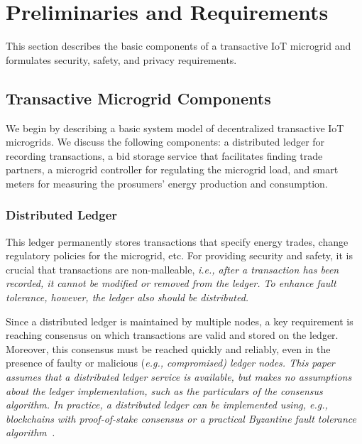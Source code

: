 \section{Preliminaries and Requirements}

This section describes the basic components of a transactive IoT
microgrid and formulates security, safety, and privacy requirements.

\subsection{Transactive Microgrid Components}

We begin by describing a basic system model of decentralized
transactive IoT microgrids.  We discuss the following components: a
distributed ledger for recording transactions, a bid storage service
that facilitates finding trade partners, a microgrid controller for
regulating the microgrid load, and smart meters for measuring the
prosumers' energy production and consumption.

\subsubsection{Distributed Ledger}
This ledger permanently stores transactions that specify energy
trades, change regulatory policies for the microgrid, etc.  For
providing security and safety, it is crucial that transactions are
non-malleable, \em{i.e.}, after a transaction has been recorded, it
cannot be modified or removed from the ledger.  To enhance fault
tolerance, however, the ledger also should be distributed.

Since a distributed ledger is maintained by multiple nodes, a key
requirement is reaching consensus on which transactions are valid and
stored on the ledger.  Moreover, this consensus must be reached
quickly and reliably, even in the presence of faulty or malicious
(\em{e.g.}, compromised) ledger nodes.  This paper assumes that a
distributed ledger service is available, but makes no assumptions
about the ledger implementation, such as the particulars of the
consensus algorithm.  In practice, a distributed ledger can be
implemented using, \em{e.g.}, \emph{blockchains} with proof-of-stake
consensus or a practical Byzantine fault tolerance
algorithm~\cite{castro1999practical}.

